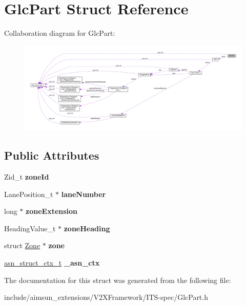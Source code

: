 \hypertarget{structGlcPart}{}\section{Glc\+Part Struct Reference}
\label{structGlcPart}


Collaboration diagram for Glc\+Part\+:\nopagebreak
\begin{figure}[H]
\begin{center}
\leavevmode
\includegraphics[width=350pt]{structGlcPart__coll__graph}
\end{center}
\end{figure}
\subsection*{Public Attributes}
\begin{DoxyCompactItemize}
\item 
Zid\+\_\+t {\bfseries zone\+Id}\hypertarget{structGlcPart_abeef2e5ad11de2445198906e3d6a833c}{}\label{structGlcPart_abeef2e5ad11de2445198906e3d6a833c}

\item 
Lane\+Position\+\_\+t $\ast$ {\bfseries lane\+Number}\hypertarget{structGlcPart_a2aad9a1f8402078d6bce9882e151cd8f}{}\label{structGlcPart_a2aad9a1f8402078d6bce9882e151cd8f}

\item 
long $\ast$ {\bfseries zone\+Extension}\hypertarget{structGlcPart_a6f64cccfc6ee8db2323ff31e5a6f6b83}{}\label{structGlcPart_a6f64cccfc6ee8db2323ff31e5a6f6b83}

\item 
Heading\+Value\+\_\+t $\ast$ {\bfseries zone\+Heading}\hypertarget{structGlcPart_ab90c04dda7c44dc0c789cd482656458c}{}\label{structGlcPart_ab90c04dda7c44dc0c789cd482656458c}

\item 
struct \hyperlink{structZone}{Zone} $\ast$ {\bfseries zone}\hypertarget{structGlcPart_a7e6fa82965f7b46c993027efc7fdc1b1}{}\label{structGlcPart_a7e6fa82965f7b46c993027efc7fdc1b1}

\item 
\hyperlink{structasn__struct__ctx__s}{asn\+\_\+struct\+\_\+ctx\+\_\+t} {\bfseries \+\_\+asn\+\_\+ctx}\hypertarget{structGlcPart_a44ecb239680c6a5cb3014d90a8531185}{}\label{structGlcPart_a44ecb239680c6a5cb3014d90a8531185}

\end{DoxyCompactItemize}


The documentation for this struct was generated from the following file\+:\begin{DoxyCompactItemize}
\item 
include/aimsun\+\_\+extensions/\+V2\+X\+Framework/\+I\+T\+S-\/spec/Glc\+Part.\+h\end{DoxyCompactItemize}

